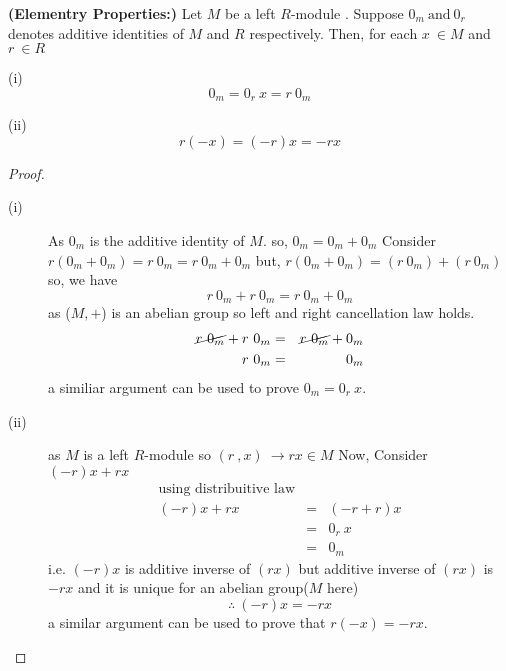 \begin{thm}{\textbf{(Elementry Properties:)}}\newline
	Let $M$ be a left $R$-module . Suppose $0_m \ \text{and} \ 0_r$ denotes additive identities of $M$ and $R$ respectively. Then,  for each $x \ \in M$ and $r \ \in R$ \newline
\begin{description}
\item (i)
	\begin{equation*}
	0_m = 0_r\ x = r\ 0_m
	\end{equation*}
\item (ii)
	\begin{equation*}
	r(-x) =  (-r)x = -rx
	\end{equation*}
\end{description}
\end{thm}
\begin{proof}
	\begin{description}
		\item[(i)]
As $0_m$ is the additive identity of $M$. so, $0_m = 0_m + 0_m$\newline
Consider 
 $ r(0_m + 0_m) = r\ 0_m  = r\ 0_m +0_m $\newline
but, $r(0_m + 0_m) = (r\ 0_m) +(r\ 0_m)$ \newline
so, we have \begin{equation*}
r\ 0_m +r\ 0_m = r\ 0_m + 0_m
\end{equation*}
as ($M,+$) is an abelian group so left and right cancellation law holds.
\begin{eqnarray*}
\cancel{r\ 0_m} +r\ 0_m &=& \cancel{r\ 0_m} + 0_m \\ r\ 0_m &=& 0_m
\end{eqnarray*}
a similiar argument can be used to prove $0_m = 0_r\ x$.
\item[(ii)]
as $M$ is a left $R$-module so $(r \ , x )\ \rightarrow rx \in M$ \newline
Now, Consider $(-r)x + rx$
\begin{eqnarray*}
\text{using distribuitive law} \\ (-r)x + rx &=& (-r + r)x \\  &=& 0_r \ x \\ &=& 0_m
\end{eqnarray*}
i.e. $(-r)x$ is additive inverse of  $(rx)$ but additive inverse of $(rx)$ is $-rx$ and it is unique for an abelian group($M$ here)
\begin{equation*}
\therefore \ (-r)x = -rx
\end{equation*}
a similar argument can be used to prove that $r(-x)  = -r x$.
\end{description}
\end{proof}
